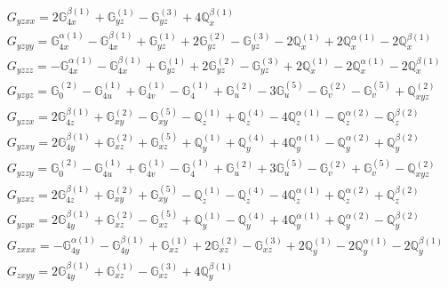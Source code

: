 \documentclass[fleqn,8pt,landscape]{jsarticle}
\begin{document}
\begin{align*}
& G_{yzxx} = 2 \mathbb{G}_{4x}^{\beta(1)} + \mathbb{G}_{yz}^{(1)} - \mathbb{G}_{yz}^{(3)} + 4 \mathbb{Q}_{x}^{\beta(1)} \\
& G_{yzyy} = \mathbb{G}_{4x}^{\alpha(1)} - \mathbb{G}_{4x}^{\beta(1)} + \mathbb{G}_{yz}^{(1)} + 2 \mathbb{G}_{yz}^{(2)} - \mathbb{G}_{yz}^{(3)} - 2 \mathbb{Q}_{x}^{(1)} + 2 \mathbb{Q}_{x}^{\alpha(1)} - 2 \mathbb{Q}_{x}^{\beta(1)} \\
& G_{yzzz} = - \mathbb{G}_{4x}^{\alpha(1)} - \mathbb{G}_{4x}^{\beta(1)} + \mathbb{G}_{yz}^{(1)} + 2 \mathbb{G}_{yz}^{(2)} - \mathbb{G}_{yz}^{(3)} + 2 \mathbb{Q}_{x}^{(1)} - 2 \mathbb{Q}_{x}^{\alpha(1)} - 2 \mathbb{Q}_{x}^{\beta(1)} \\
& G_{yzyz} = \mathbb{G}_{0}^{(2)} - \mathbb{G}_{4u}^{(1)} + \mathbb{G}_{4v}^{(1)} - \mathbb{G}_{4}^{(1)} + \mathbb{G}_{u}^{(2)} - 3 \mathbb{G}_{u}^{(5)} - \mathbb{G}_{v}^{(2)} - \mathbb{G}_{v}^{(5)} + \mathbb{Q}_{xyz}^{(2)} \\
& G_{yzzx} = 2 \mathbb{G}_{4z}^{\beta(1)} + \mathbb{G}_{xy}^{(2)} - \mathbb{G}_{xy}^{(5)} - \mathbb{Q}_{z}^{(1)} + \mathbb{Q}_{z}^{(4)} - 4 \mathbb{Q}_{z}^{\alpha(1)} - \mathbb{Q}_{z}^{\alpha(2)} - \mathbb{Q}_{z}^{\beta(2)} \\
& G_{yzxy} = 2 \mathbb{G}_{4y}^{\beta(1)} + \mathbb{G}_{xz}^{(2)} + \mathbb{G}_{xz}^{(5)} + \mathbb{Q}_{y}^{(1)} + \mathbb{Q}_{y}^{(4)} + 4 \mathbb{Q}_{y}^{\alpha(1)} - \mathbb{Q}_{y}^{\alpha(2)} + \mathbb{Q}_{y}^{\beta(2)} \\
& G_{yzzy} = \mathbb{G}_{0}^{(2)} - \mathbb{G}_{4u}^{(1)} + \mathbb{G}_{4v}^{(1)} - \mathbb{G}_{4}^{(1)} + \mathbb{G}_{u}^{(2)} + 3 \mathbb{G}_{u}^{(5)} - \mathbb{G}_{v}^{(2)} + \mathbb{G}_{v}^{(5)} - \mathbb{Q}_{xyz}^{(2)} \\
& G_{yzxz} = 2 \mathbb{G}_{4z}^{\beta(1)} + \mathbb{G}_{xy}^{(2)} + \mathbb{G}_{xy}^{(5)} - \mathbb{Q}_{z}^{(1)} - \mathbb{Q}_{z}^{(4)} - 4 \mathbb{Q}_{z}^{\alpha(1)} + \mathbb{Q}_{z}^{\alpha(2)} + \mathbb{Q}_{z}^{\beta(2)} \\
& G_{yzyx} = 2 \mathbb{G}_{4y}^{\beta(1)} + \mathbb{G}_{xz}^{(2)} - \mathbb{G}_{xz}^{(5)} + \mathbb{Q}_{y}^{(1)} - \mathbb{Q}_{y}^{(4)} + 4 \mathbb{Q}_{y}^{\alpha(1)} + \mathbb{Q}_{y}^{\alpha(2)} - \mathbb{Q}_{y}^{\beta(2)} \\
& G_{zxxx} = - \mathbb{G}_{4y}^{\alpha(1)} - \mathbb{G}_{4y}^{\beta(1)} + \mathbb{G}_{xz}^{(1)} + 2 \mathbb{G}_{xz}^{(2)} - \mathbb{G}_{xz}^{(3)} + 2 \mathbb{Q}_{y}^{(1)} - 2 \mathbb{Q}_{y}^{\alpha(1)} - 2 \mathbb{Q}_{y}^{\beta(1)} \\
& G_{zxyy} = 2 \mathbb{G}_{4y}^{\beta(1)} + \mathbb{G}_{xz}^{(1)} - \mathbb{G}_{xz}^{(3)} + 4 \mathbb{Q}_{y}^{\beta(1)} \\

\end{align*}
\end{document}
